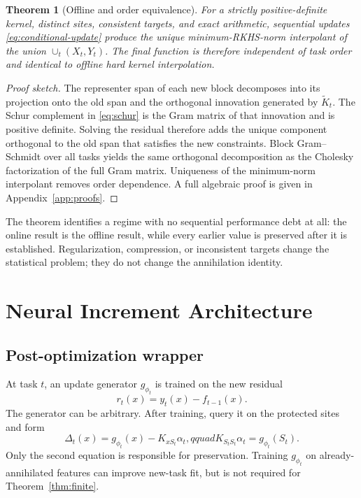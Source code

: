 \documentclass{vanish_ieee}
\newtheorem{theorem}{Theorem}
\theoremstyle{definition}
\begin{document}
\begin{theorem}[Offline and order equivalence]
For a strictly positive-definite kernel, distinct sites, consistent targets, and exact arithmetic, sequential updates \eqref{eq:conditional-update} produce the unique minimum-RKHS-norm interpolant of the union $\cup_t(X_t,Y_t)$.  The final function is therefore independent of task order and identical to offline hard kernel interpolation.
\label{thm:offline}
\end{theorem}
\begin{proof}[Proof sketch]
The representer span of each new block decomposes into its projection onto the old span and the orthogonal innovation generated by $\widetilde K_t$.  The Schur complement in \eqref{eq:schur} is the Gram matrix of that innovation and is positive definite.  Solving the residual therefore adds the unique component orthogonal to the old span that satisfies the new constraints.  Block Gram--Schmidt over all tasks yields the same orthogonal decomposition as the Cholesky factorization of the full Gram matrix.  Uniqueness of the minimum-norm interpolant removes order dependence.  A full algebraic proof is given in Appendix~\ref{app:proofs}.
\end{proof}

The theorem identifies a regime with no sequential performance debt at all: the online result is the offline result, while every earlier value is preserved after it is established.  Regularization, compression, or inconsistent targets change the statistical problem; they do not change the annihilation identity.

\section{Neural Increment Architecture}

\subsection{Post-optimization wrapper}

At task $t$, an update generator $g_{\phi_t}$ is trained on the new residual
\begin{equation}
r_t(x)=y_t(x)-f_{t-1}(x).
\end{equation}
The generator can be arbitrary.  After training, query it on the protected sites and form
\begin{equation}
\Delta_t(x)=g_{\phi_t}(x)-K_{xS_t}\alpha_t,qquad
K_{S_tS_t}\alpha_t=g_{\phi_t}(S_t).
\label{eq:neural-wrapper}
\end{equation}
Only the second equation is responsible for preservation.  Training $g_{\phi_t}$ on already-annihilated features can improve new-task fit, but is not required for Theorem~\ref{thm:finite}.
\end{document}
